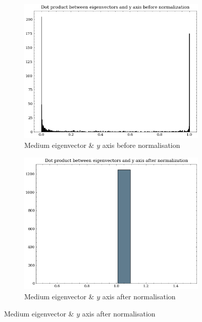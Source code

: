 \begin{figure}[H]
\vspace{1cm}
    \begin{subfigure}[b]{0.45\textwidth}
        \centering
        \includegraphics[width=\textwidth]{assets/preprocessing/Dot_product_between_eigenvectors_and_y_axis_before_normalization.png}
        \caption{Medium eigenvector \& $y$ axis before normalisation}
        \label{fig:resampling-alignment-y-before}
    \end{subfigure}
    \hfill
    \begin{subfigure}[b]{0.45\textwidth}
        \centering
        \includegraphics[width=\textwidth]{assets/preprocessing/Dot_product_between_eigenvectors_and_y_axis_after_normalization.png}
        \caption{Medium eigenvector \& $y$ axis after normalisation}
        \label{fig:resampling-alignment-y-after}
    \end{subfigure}


\end{figure}
